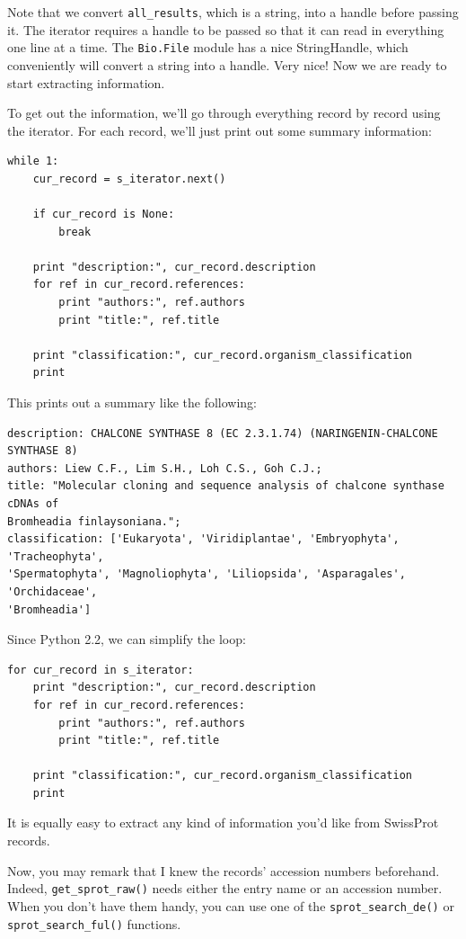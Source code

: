 \documentclass{report}
\begin{document}
Note that we convert \verb|all_results|, which is a string, into a handle before passing it. The iterator requires a handle to be passed so that it can read in everything one line at a time. The \verb|Bio.File| module has a nice StringHandle, which conveniently will convert a string into a handle. Very nice! Now we are ready to start extracting information.


To get out the information, we'll go through everything record by record using the iterator. For each record, we'll just print out some summary information:

\begin{verbatim}
while 1:
    cur_record = s_iterator.next()

    if cur_record is None:
        break

    print "description:", cur_record.description
    for ref in cur_record.references:
        print "authors:", ref.authors
        print "title:", ref.title

    print "classification:", cur_record.organism_classification
    print
\end{verbatim}

This prints out a summary like the following:

\begin{verbatim}
description: CHALCONE SYNTHASE 8 (EC 2.3.1.74) (NARINGENIN-CHALCONE SYNTHASE 8)
authors: Liew C.F., Lim S.H., Loh C.S., Goh C.J.;
title: "Molecular cloning and sequence analysis of chalcone synthase cDNAs of
Bromheadia finlaysoniana.";
classification: ['Eukaryota', 'Viridiplantae', 'Embryophyta', 'Tracheophyta', 
'Spermatophyta', 'Magnoliophyta', 'Liliopsida', 'Asparagales', 'Orchidaceae', 
'Bromheadia']
\end{verbatim}

Since Python 2.2, we can simplify the loop:

\begin{verbatim}
for cur_record in s_iterator:
    print "description:", cur_record.description
    for ref in cur_record.references:
        print "authors:", ref.authors
        print "title:", ref.title

    print "classification:", cur_record.organism_classification
    print
\end{verbatim}


It is equally easy to extract any kind of information you'd like from SwissProt records.


Now, you may remark that I knew the records' accession numbers
beforehand. Indeed, \verb|get_sprot_raw()| needs either the entry name
or an accession number. When you don't have them handy, you can use
one of the \verb|sprot_search_de()| or \verb|sprot_search_ful()|
functions.
\end{document}
